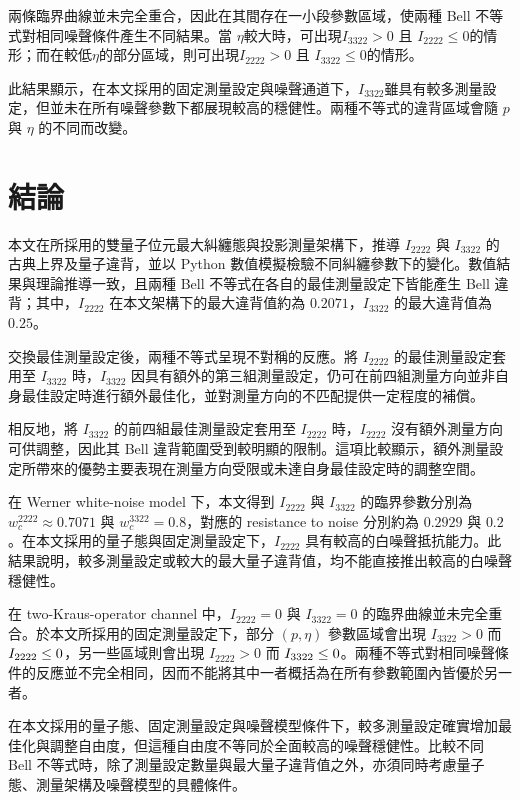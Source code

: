 \documentclass[12pt, a4paper, twoside, reqno]{article}
\begin{document}
\noindent 兩條臨界曲線並未完全重合，因此在其間存在一小段參數區域，使兩種 Bell 不等式對相同噪聲條件產生不同結果。當 $\eta$較大時，可出現$I_{3322}>0$ 且 $I_{2222}\leq0$的情形；而在較低$\eta$的部分區域，則可出現$I_{2222}>0$ 且 $I_{3322}\leq0$的情形。

\noindent 此結果顯示，在本文採用的固定測量設定與噪聲通道下，$I_{3322}$雖具有較多測量設定，但並未在所有噪聲參數下都展現較高的穩健性。兩種不等式的違背區域會隨 $p$ 與 $\eta$ 的不同而改變。

\section{結論}
本文在所採用的雙量子位元最大糾纏態與投影測量架構下，推導 $I_{2222}$ 與 $I_{3322}$ 的古典上界及量子違背，並以 Python 數值模擬檢驗不同糾纏參數下的變化。數值結果與理論推導一致，且兩種 Bell 不等式在各自的最佳測量設定下皆能產生 Bell 違背；其中，$I_{2222}$ 在本文架構下的最大違背值約為 $0.2071$，$I_{3322}$ 的最大違背值為 $0.25$。

\indent 交換最佳測量設定後，兩種不等式呈現不對稱的反應。將 $I_{2222}$ 的最佳測量設定套用至 $I_{3322}$ 時，$I_{3322}$ 因具有額外的第三組測量設定，仍可在前四組測量方向並非自身最佳設定時進行額外最佳化，並對測量方向的不匹配提供一定程度的補償。

\indent 相反地，將 $I_{3322}$ 的前四組最佳測量設定套用至 $I_{2222}$ 時，$I_{2222}$ 沒有額外測量方向可供調整，因此其 Bell 違背範圍受到較明顯的限制。這項比較顯示，額外測量設定所帶來的優勢主要表現在測量方向受限或未達自身最佳設定時的調整空間。

\indent 在 Werner white-noise model 下，本文得到 $I_{2222}$ 與 $I_{3322}$ 的臨界參數分別為 $w_c^{2222}\approx0.7071$ 與 $w_c^{3322}=0.8$，對應的 resistance to noise 分別約為 $0.2929$ 與 $0.2$。在本文採用的量子態與固定測量設定下，$I_{2222}$ 具有較高的白噪聲抵抗能力。此結果說明，較多測量設定或較大的最大量子違背值，均不能直接推出較高的白噪聲穩健性。

\indent 在 two-Kraus-operator channel 中，$I_{2222}=0$ 與 $I_{3322}=0$ 的臨界曲線並未完全重合。於本文所採用的固定測量設定下，部分 $(p,\eta)$ 參數區域會出現 $I_{3322}>0$ 而 $I_{2222}\csname leq\endcsname0$，另一些區域則會出現 $I_{2222}>0$ 而 $I_{3322}\csname leq\endcsname0$。兩種不等式對相同噪聲條件的反應並不完全相同，因而不能將其中一者概括為在所有參數範圍內皆優於另一者。

\indent 在本文採用的量子態、固定測量設定與噪聲模型條件下，較多測量設定確實增加最佳化與調整自由度，但這種自由度不等同於全面較高的噪聲穩健性。比較不同 Bell 不等式時，除了測量設定數量與最大量子違背值之外，亦須同時考慮量子態、測量架構及噪聲模型的具體條件。
\end{document}
